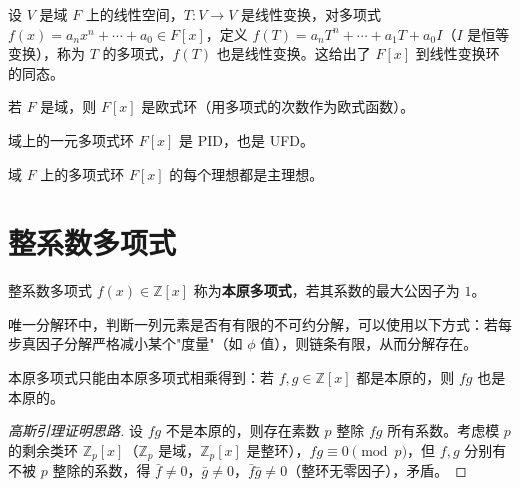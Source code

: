 \begin{example}[线性变换多项式]
设 $V$ 是域 $F$ 上的线性空间，$T \colon V \to V$ 是线性变换，对多项式 $f(x) = a_n x^n + \cdots + a_0 \in F[x]$，定义 $f(T) = a_n T^n + \cdots + a_1 T + a_0 I$（$I$ 是恒等变换），称为 $T$ 的多项式，$f(T)$ 也是线性变换。这给出了 $F[x]$ 到线性变换环的同态。
\end{example}

\begin{theorem}[定理 3：一元多项式环是欧式环]
若 $F$ 是域，则 $F[x]$ 是欧式环（用多项式的次数作为欧式函数）。
\end{theorem}

\begin{corollary}
域上的一元多项式环 $F[x]$ 是 PID，也是 UFD。
\end{corollary}

\begin{lemma}[引理：多项式环都是主理想环]
域 $F$ 上的多项式环 $F[x]$ 的每个理想都是主理想。
\end{lemma}

\section{整系数多项式}

\begin{definition}[本原多项式]
整系数多项式 $f(x) \in \mathbb{Z}[x]$ 称为\textbf{本原多项式}，若其系数的最大公因子为 $1$。
\end{definition}

\begin{lemma}[有限序列判定（引理 1）]
唯一分解环中，判断一列元素是否有有限的不可约分解，可以使用以下方式：若每步真因子分解严格减小某个"度量"（如 $\phi$ 值），则链条有限，从而分解存在。
\end{lemma}

\begin{lemma}[高斯引理（引理 1）]
本原多项式只能由本原多项式相乘得到：若 $f, g \in \mathbb{Z}[x]$ 都是本原的，则 $fg$ 也是本原的。
\end{lemma}

\begin{proof}[高斯引理证明思路]
设 $fg$ 不是本原的，则存在素数 $p$ 整除 $fg$ 所有系数。考虑模 $p$ 的剩余类环 $\mathbb{Z}_p[x]$（$\mathbb{Z}_p$ 是域，$\mathbb{Z}_p[x]$ 是整环），$fg \equiv 0 \pmod{p}$，但 $f, g$ 分别有不被 $p$ 整除的系数，得 $\bar{f} \ne 0$，$\bar{g} \ne 0$，$\bar{f}\bar{g} \ne 0$（整环无零因子），矛盾。
\end{proof}

